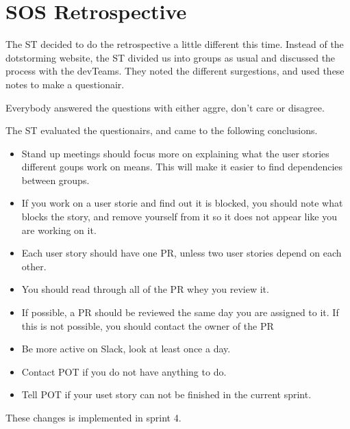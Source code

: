 \section{SOS Retrospective}

The \gls{ST} decided to do the retrospective a little different this time. Instead of the dotstorming website, the \gls{ST} divided us into groups as usual and discussed the process with the \glspl{devTeam}. They noted the different surgestions, and used these notes to make a questionair. 

Everybody answered the questions with either aggre, don't care or disagree. 

The \gls{ST} evaluated the questionairs, and came to the following conclusions. 

\begin{itemize}
    \item Stand up meetings should focus more on explaining what the user stories different goups work on means. This will make it easier to find dependencies between groups. 
    \item If you work on a user storie and find out it is blocked, you should note what blocks the story, and remove yourself from it so it does not appear like you are working on it.
    \item Each user story should have one \gls{PR}, unless two user stories depend on each other. 
    \item You should read through all of the \gls{PR} whey you review it.
    \item If possible, a \gls{PR} should be reviewed the same day you are assigned to it. If this is not possible, you should contact the owner of the \gls{PR}
    \item Be more active on Slack, look at least once a day.
    \item Contact \gls{POT} if you do not have anything to do.
    \item Tell \gls{POT} if your uset story can not be finished in the current sprint. 
\end{itemize}

These changes is implemented in sprint 4. 